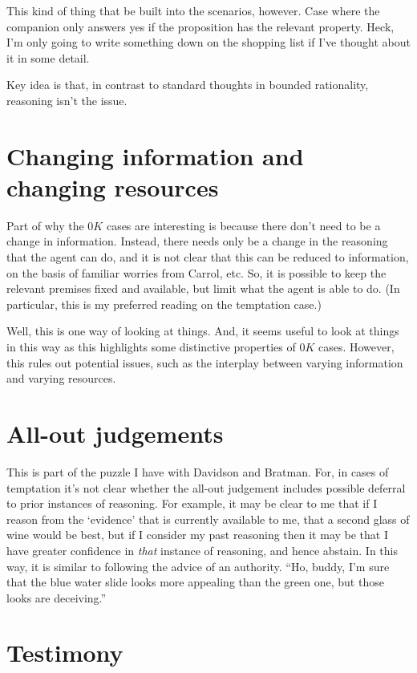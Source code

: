 \documentclass[10pt]{article}
\begin{document}
This kind of thing that be built into the scenarios, however.
Case where the companion only answers yes if the proposition has the relevant property.
Heck, I'm only going to write something down on the shopping list if I've thought about it in some detail.

\newpage

Key idea is that, in contrast to standard thoughts in bounded rationality, reasoning isn't the issue.

\section{Changing information and changing resources}
\label{sec:chang-inform-chang}

Part of why the \(0K\) cases are interesting is because there don't need to be a change in information.
Instead, there needs only be a change in the reasoning that the agent can do, and it is not clear that this can be reduced to information, on the basis of familiar worries from Carrol, etc.
So, it is possible to keep the relevant premises fixed and available, but limit what the agent is able to do.
(In particular, this is my preferred reading on the temptation case.)

Well, this is one way of looking at things.
And, it seems useful to look at things in this way as this highlights some distinctive properties of \(0K\) cases.
However, this rules out potential issues, such as the interplay between varying information and varying resources.

\section{All-out judgements}
\label{sec:all-out-judgements}

This is part of the puzzle I have with Davidson and Bratman.
For, in cases of temptation it's not clear whether the all-out judgement includes possible deferral to prior instances of reasoning.
For example, it may be clear to me that if I reason from the `evidence' that is currently available to me, that a second glass of wine would be best, but if I consider my past reasoning then it may be that I have greater confidence in \emph{that} instance of reasoning, and hence abstain.
In this way, it is similar to following the advice of an authority.
``Ho, buddy, I'm sure that the blue water slide looks more appealing than the green one, but those looks are deceiving.''

\section{Testimony}
\label{sec:testimony}
\end{document}
